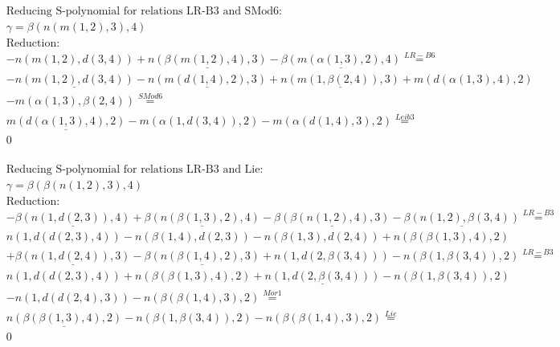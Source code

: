 \documentclass[11pt]{amsart}
\begin{document}
\begin{align*} 
& \text{Reducing S-polynomial for relations LR-B3 and SMod6:} \\ 
& \gamma = \beta(n(m(1,2),3),4) \\ 
& \text{Reduction}: \\& - n(m(1,2),d(3,4)) + \underline{n(\beta(m(1,2),4),3)} - \underline{\beta(m(\alpha(1,3),2),4)} \stackrel{ LR-B6 }{=}  \\ 
& - \underline{n(m(1,2),d(3,4))} - \underline{n(m(d(1,4),2),3)} + \underline{n(m(1,\beta(2,4)),3)} + m(d(\alpha(1,3),4),2)\\ 
 &  - m(\alpha(1,3),\beta(2,4)) \stackrel{ SMod6 }{=}  \\ 
&\underline{m(d(\alpha(1,3),4),2)} - m(\alpha(1,d(3,4)),2) - m(\alpha(d(1,4),3),2) \stackrel{ Leib3 }{=}  \\ 
&0\\ 
\end{align*} 
 
\begin{align*} 
& \text{Reducing S-polynomial for relations LR-B3 and Lie:} \\ 
& \gamma = \beta(\beta(n(1,2),3),4) \\ 
& \text{Reduction}: \\& - \underline{\beta(n(1,d(2,3)),4)} + \underline{\beta(n(\beta(1,3),2),4)} - \underline{\beta(\beta(n(1,2),4),3)} - \underline{\beta(n(1,2),\beta(3,4))} \stackrel{ LR-B3 }{=}  \\ 
&n(1,d(d(2,3),4)) - n(\beta(1,4),d(2,3)) - n(\beta(1,3),d(2,4)) + n(\beta(\beta(1,3),4),2)\\ 
 &  + \underline{\beta(n(1,d(2,4)),3)} - \underline{\beta(n(\beta(1,4),2),3)} + n(1,d(2,\beta(3,4))) - n(\beta(1,\beta(3,4)),2) \stackrel{ LR-B3 }{=}  \\ 
&n(1,d(d(2,3),4)) + n(\beta(\beta(1,3),4),2) + \underline{n(1,d(2,\beta(3,4)))} - n(\beta(1,\beta(3,4)),2)\\ 
 &  - n(1,d(d(2,4),3)) - n(\beta(\beta(1,4),3),2) \stackrel{ Mor1 }{=}  \\ 
&\underline{n(\beta(\beta(1,3),4),2)} - n(\beta(1,\beta(3,4)),2) - n(\beta(\beta(1,4),3),2) \stackrel{ Lie }{=}  \\ 
&0\\ 
\end{align*} 
 
\end{document}
